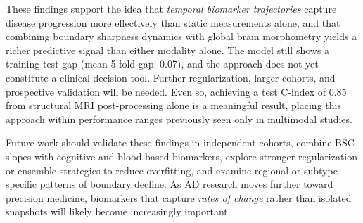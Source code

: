 \documentclass[blue]{ludusofficial}
\begin{document}
These findings support the idea that \textit{temporal biomarker trajectories} capture disease progression more effectively than static measurements alone, and that combining boundary sharpness dynamics with global brain morphometry yields a richer predictive signal than either modality alone. The model still shows a training-test gap (mean 5-fold gap: 0.07), and the approach does not yet constitute a clinical decision tool. Further regularization, larger cohorts, and prospective validation will be needed. Even so, achieving a test C-index of 0.85 from structural MRI post-processing alone is a meaningful result, placing this approach within performance ranges previously seen only in multimodal studies.

Future work should validate these findings in independent cohorts, combine BSC slopes with cognitive and blood-based biomarkers, explore stronger regularization or ensemble strategies to reduce overfitting, and examine regional or subtype-specific patterns of boundary decline. As AD research moves further toward precision medicine, biomarkers that capture \textit{rates of change} rather than isolated snapshots will likely become increasingly important.
\end{document}
